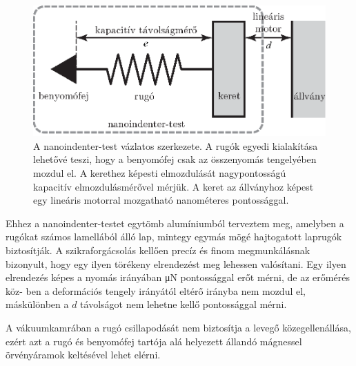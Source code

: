 \documentclass[a5paper,twoside,10pt]{article}
\begin{document}
\renewcommand{\figurename}{Ábra.}
\begin{figure}[htbp!] 
\centering    
\includegraphics[width=1\textwidth]{rugo}
\caption{A nanoindenter-test vázlatos szerkezete. A rugók egyedi kialakítása lehetővé teszi, hogy a benyomófej csak az összenyomás tengelyében mozdul el. A kerethez képesti elmozdulását nagypontosságú kapacitív elmozdulásmérővel mérjük. A keret az állványhoz képest egy lineáris motorral mozgatható nanométeres pontossággal.}
\label{fig:rugo}
\end{figure}

Ehhez a nanoindenter-testet egytömb alumíniumból terveztem meg, amelyben a rugókat számos lamellából álló lap, mintegy egymás mögé hajtogatott laprugók biztosítják. A szikraforgácsolás kellően precíz és finom megmunkálásnak bizonyult, hogy egy ilyen törékeny elrendezést meg lehessen valósítani. Egy ilyen elrendezés képes a nyomás irányában \si{\micro\newton} pontossággal erőt mérni, de az erőmérés köz- ben a deformációs tengely irányától eltérő irányba nem mozdul el, máskülönben a $d$ távolságot nem lehetne kellő pontossággal mérni.

A vákuumkamrában a rugó csillapodását nem biztosítja a levegő közegellenállása, ezért azt a rugó és benyomófej tartója alá helyezett állandó mágnessel örvényáramok keltésével lehet elérni.
\end{document}
